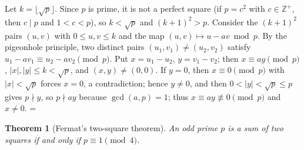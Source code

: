 \documentclass[11pt]{article}
\makeatletter
\theoremstyle{ntstyle}
\newtheorem{theorem}{Theorem}[subsection]
\let\nt@closedisplay\]
\def\nt@guardedclose{\@ifnextchar\par{\nt@closeafterpar}{\@ifnextchar\end{\postdisplaypenalty\@M\nt@closedisplay}{\nt@closedisplay}}}
\def\nt@closeafterpar\par{\@ifnextchar\par{\nt@closeafterpar}{\@ifnextchar\end{\postdisplaypenalty\@M\nt@closedisplay\par}{\nt@closedisplay\par}}}
\renewenvironment{proof}[1][\proofname]{\par
  \pushQED{\qed}\normalfont\topsep\medskipamount\edef\nt@afterproof{\@endparpenalty=\the\@endparpenalty\relax}\@beginparpenalty\@M\@endparpenalty\@M\let\]\nt@guardedclose\trivlist\item[]\textit{#1\@addpunct{.}} \ignorespaces}{\ifvmode\addpenalty\@M\fi\popQED\nt@afterproof\endtrivlist\@endpefalse}
\makeatother
\begin{document}
\begin{proof} Let $k = \lfloor \sqrt{p} \rfloor$. Since $p$ is
	prime, it is not a perfect square (if $p = c^{2}$ with $c \in \mathbb{Z}^+$,
	then $c \mid p$ and $1 < c < p$), so $k < \sqrt{p}$ and $(k+1)^2 > p$. Consider the $(k+1)^2$ pairs $(u, v)$
	with $0 \le u, v \le k$ and the map $(u, v) \mapsto u - a v \bmod p$.
	By the pigeonhole principle, two distinct pairs $(u_1, v_1) \neq (u_2, v_2)$ satisfy
	$u_1 - a v_1 \equiv u_2 - a v_2 \pmod{p}$. Put $x = u_1 - u_2$, $y =
		v_1 - v_2$; then $x \equiv a y \pmod{p}$, $|x|, |y| \le k < \sqrt{p}$,
	and $(x,y) \neq (0,0)$. If $y = 0$, then $x \equiv 0 \pmod{p}$ with $|x| < \sqrt{p}$
	forces $x = 0$, a contradiction; hence $y \neq 0$, and then $0 < |y| < \sqrt{p} \le p$ gives $p \nmid y$, so
	$p \nmid ay$ because $\gcd(a, p) = 1$; thus $x \equiv ay \not\equiv 0
		\pmod{p}$ and $x \neq 0$.
\end{proof}
\begin{theorem}[Fermat's two-square theorem]\label{thm:8.1.2} An
	odd prime $p$ is a sum of two squares if and only if $p \equiv 1 \pmod{4}$.
\end{theorem}
\end{document}
